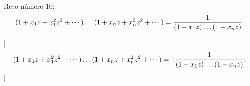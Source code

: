 

\bigskip

\enunciadoS Reto n\'umero 10:
$$(1+x_1z+x_1^2z^2+\cdots)\dots(1+x_nz+x_n^2z^2+\cdots)=
{1\over(1 -x_1z)\dots(1-x_nz)}.$$
\bigskip

\respuestaS

|$$(1+x_1z+x_1^2z^2+\cdots)\dots(1+x_nz+x_n^2z^2+\cdots)=|

|{1\over(1 -x_1z)\dots(1-x_nz)}.$$|

\bye


